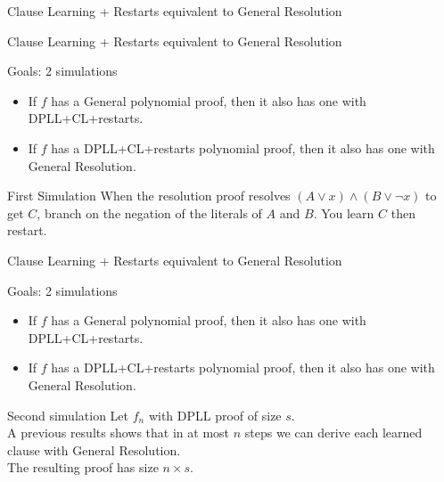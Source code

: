 \documentclass[page number]{beamer}
\begin{document}
\begin{frame}{Clause Learning + Restarts equivalent to General Resolution}
  \begin{center}
  \end{center}
\end{frame}


\begin{frame}{Clause Learning + Restarts equivalent to General Resolution}
  \begin{exampleblock}{Goals: 2 simulations}
    \begin{itemize}
    \item If $f$ has a General polynomial proof, then it also has one with DPLL+CL+restarts.
    \item If $f$ has a DPLL+CL+restarts polynomial proof, then it also has one with General Resolution.
    \end{itemize}
  \end{exampleblock}
  \vfill
  \begin{block}{First Simulation}
    When the resolution proof resolves $(A\vee x) \wedge (B\vee \neg x)$ to get $C$, branch on the negation of the literals of $A$ and $B$.
    You learn $C$ then restart.
  \end{block}

\end{frame}

\begin{frame}{Clause Learning + Restarts equivalent to General Resolution}
  \begin{exampleblock}{Goals: 2 simulations}
    \begin{itemize}
    \item If $f$ has a General polynomial proof, then it also has one with DPLL+CL+restarts.
    \item If $f$ has a DPLL+CL+restarts polynomial proof, then it also has one with General Resolution.
    \end{itemize}
  \end{exampleblock}
  \vfill
  \begin{block}{Second simulation}
    Let $f_n$ with DPLL proof of size $s$.\\
    A previous results shows that in at most $n$ steps we can derive each learned clause with General Resolution.\\
    The resulting proof has size $n\times s$.
  \end{block}
\end{frame}
\end{document}
